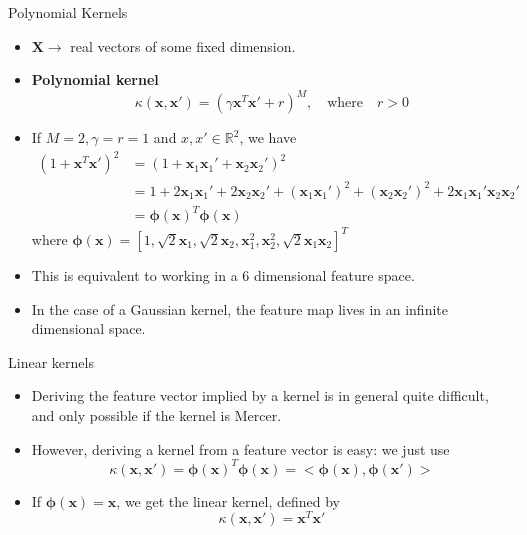 \documentclass[10pt,mathserif]{beamer}
\begin{document}
    
\begin{frame}{Polynomial Kernels}
\begin{itemize}
    \item $\mathcal{\bm{X}} \rightarrow$ real vectors of some fixed dimension. 
    \item \textbf{Polynomial kernel} 
    \begin{equation*}
        \kappa (\bm{x}, \bm{x'}) = (\gamma \bm{x}^T \bm{x}' + r)^M, \quad\text{where}\quad r > 0
    \end{equation*}
    \item If $M = 2, \gamma = r = 1$ and $x, x' \in \mathbb{R}^2$, we have
    \begin{equation*}
        \begin{split}
            (1 + \bm{x}^T \bm{x'})^2 & = (1 + \bm{x}_1\bm{x}_1' + \bm{x}_2\bm{x}_2')^2\\
            & = 1 + 2\bm{x}_1\bm{x}_1' + 2\bm{x}_2\bm{x}_2' + (\bm{x}_1\bm{x}_1')^2 + (\bm{x}_2\bm{x}_2')^2 + 2\bm{x}_1\bm{x}_1'\bm{x}_2\bm{x}_2'\\
            & = \bm{\phi}(\bm{x})^T \bm{\phi}(\bm{x})
        \end{split}
    \end{equation*}
    where $\bm{\phi}(\bm{x}) = [1, \sqrt{2} \bm{x}_1, \sqrt{2} \bm{x}_2, \bm{x}_1^2, \bm{x}_2^2, \sqrt{2} \bm{x}_1\bm{x}_2]^T$
    \item This is equivalent to working in a 6 dimensional feature space. 
    \item In the case of a Gaussian kernel, the feature map lives in an infinite dimensional space. 
\end{itemize}
\end{frame}

\begin{frame}{Linear kernels}
\begin{itemize}
    \item Deriving the feature vector implied by a kernel is in general quite difficult, and only possible if the kernel is Mercer.
    \item However, deriving a kernel from a feature vector is easy: we just use
    \begin{equation*}
        \kappa (\bm{x}, \bm{x'}) = \bm{\phi}(\bm{x})^T \bm{\phi}(\bm{x}) = <\bm{\phi}(\bm{x}), \bm{\phi}(\bm{x}')>
    \end{equation*}
    \item If $\bm{\phi}(\bm{x}) = \bm{x}$, we get the linear kernel, defined by
    \begin{equation*}
        \kappa (\bm{x}, \bm{x'}) = \bm{x}^T \bm{x'}
    \end{equation*}
\end{itemize}
\end{frame}
\end{document}
